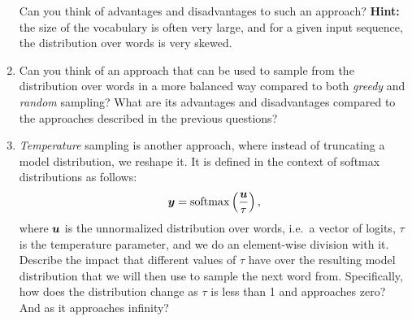 \documentclass[11pt,a4paper]{article}
\begin{document}
\begin{enumerate}[label=(\alph*)]
          Can you think of advantages and disadvantages to such an approach?
          \textbf{Hint:} the size of the vocabulary is often very large, and for
          a given input sequence, the distribution over words is very skewed.
    \item Can you think of an approach that can be used to sample from the
          distribution over words in a more balanced way compared to both
          \emph{greedy} and \emph{random} sampling?
          What are its advantages and disadvantages compared to the approaches
          described in the previous questions?
    \item \emph{Temperature} sampling is another approach, where instead of
          truncating a model distribution, we reshape it.
          It is defined in the context of softmax distributions as follows:
          \begin{align*}
              {\boldsymbol{y}} = \operatorname{softmax}\left(\frac{{\boldsymbol{u}}}{\tau}\right),
          \end{align*}
          where ${\boldsymbol{u}}$ is the unnormalized distribution over words, i.e.\
          a vector of logits, $\tau$ is the temperature parameter, and we do an
          element-wise division with it.
          Describe the impact that different values of $\tau$ have over the
          resulting model distribution that we will then use to sample the next
          word from.
          Specifically, how does the distribution change as $\tau$ is less than
          1 and approaches zero? And as it approaches infinity?
\end{enumerate}
\end{document}
